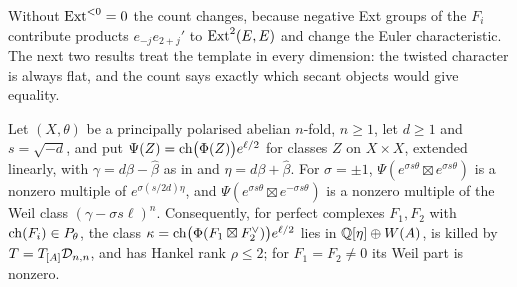Without $\operatorname{Ext}^{<0}=0$ the count changes, because negative Ext groups of the
$F_{i}$ contribute products $e_{-j}e_{2+j}'$ to $\operatorname{Ext}^{2}(E,E)$ and change the
Euler characteristic. The next two results treat the template in every
dimension: the twisted character is always flat, and the count says exactly
which secant objects would give equality.

\begin{proposition}\label{prop:flatall}
Let $(X,\theta)$ be a principally polarised abelian $n$-fold, $n\ge1$, let
$d\ge1$ and $s=\sqrt{-d}$, and put $\Psi(Z)=\operatorname{ch}\bigl(\Phi(Z)\bigr)e^{\ell/2}$
for classes $Z$ on $X\times X$, extended linearly, with $\gamma=d\beta-\widehat\beta$
as in \cite[Theorem~15.2]{paperI} and $\eta=d\beta+\widehat\beta$. For $\sigma=\pm1$, $\Psi(e^{\sigma s\theta}\boxtimes
e^{\sigma s\theta})$ is a nonzero multiple of $e^{\sigma(s/2d)\eta}$, and
$\Psi(e^{\sigma s\theta}\boxtimes e^{-\sigma s\theta})$ is a nonzero multiple of the
Weil class $(\gamma-\sigma s\ell)^{n}$. Consequently, for perfect complexes
$F_{1},F_{2}$ with $\operatorname{ch}(F_{i})\in P_{\theta}$, the class
$\kappa=\operatorname{ch}\bigl(\Phi(F_{1}\boxtimes F_{2}^{\vee})\bigr)e^{\ell/2}$ lies in
$\mathbb{Q}[\eta]\oplus W(A)$, is killed by $T=T_{[A]}\mathcal{D}_{n,n}$, and has Hankel rank
$\rho\le2$; for $F_{1}=F_{2}\ne0$ its Weil part is nonzero.
\end{proposition}

